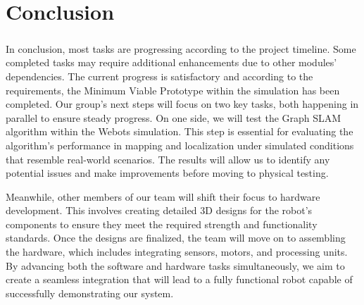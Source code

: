 \chapter{Conclusion}

\paragraph*{}
In conclusion, most tasks are progressing according to the project timeline. Some completed tasks may require additional enhancements due to other modules' dependencies. The current progress is satisfactory and according to the requirements, the Minimum Viable Prototype within the simulation has been completed.
Our group’s next steps will focus on two key tasks, both happening in parallel to ensure steady progress. On one side, we will test the Graph SLAM algorithm within the Webots simulation. This step is essential for evaluating the algorithm's performance in mapping and localization under simulated conditions that resemble real-world scenarios. The results will allow us to identify any potential issues and make improvements before moving to physical testing.

Meanwhile, other members of our team will shift their focus to hardware development. This involves creating detailed 3D designs for the robot’s components to ensure they meet the required strength and functionality standards. Once the designs are finalized, the team will move on to assembling the hardware, which includes integrating sensors, motors, and processing units. By advancing both the software and hardware tasks simultaneously, we aim to create a seamless integration that will lead to a fully functional robot capable of successfully demonstrating our system.
